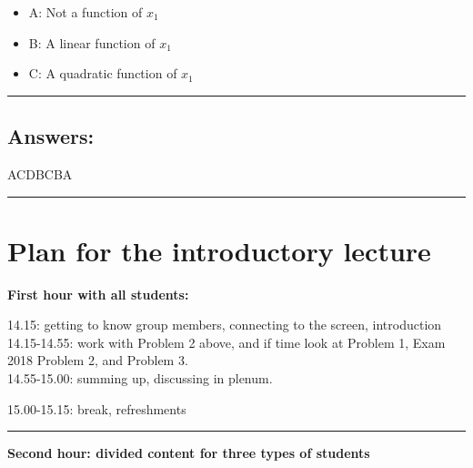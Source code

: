 \documentclass[]{article}
\providecommand{\tightlist}{%
  \setlength{\itemsep}{0pt}\setlength{\parskip}{0pt}}
\begin{document}
\begin{itemize}
\tightlist
\item
  A: Not a function of \(x_1\)
\item
  B: A linear function of \(x_1\)
\item
  C: A quadratic function of \(x_1\)
\end{itemize}

\begin{center}\rule{0.5\linewidth}{\linethickness}\end{center}

\hypertarget{answers-1}{%
\subsection{Answers:}\label{answers-1}}

ACDBCBA

\begin{center}\rule{0.5\linewidth}{\linethickness}\end{center}

\hypertarget{plan-for-the-introductory-lecture}{%
\section{Plan for the introductory
lecture}\label{plan-for-the-introductory-lecture}}

\textbf{First hour with all students:}

14.15: getting to know group members, connecting to the screen,
introduction\\
14.15-14.55: work with Problem 2 above, and if time look at Problem 1,
Exam 2018 Problem 2, and Problem 3.\\
14.55-15.00: summing up, discussing in plenum.

15.00-15.15: break, refreshments

\begin{center}\rule{0.5\linewidth}{\linethickness}\end{center}

\textbf{Second hour: divided content for three types of students}
\end{document}
